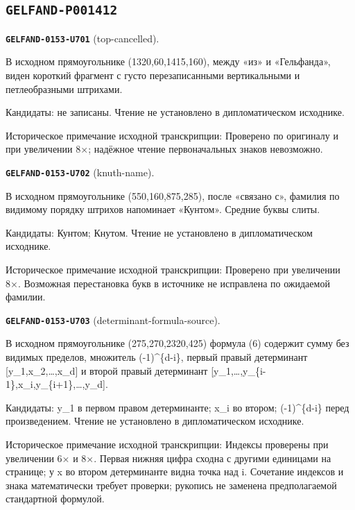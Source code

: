 \subsection*{\texttt{GELFAND-P001412}}
\par\noindent\leavevmode{}\label{GELFAND-0153-U701}\textbf{\texttt{GELFAND-0153-U701}} (top-cancelled).\nopagebreak[4]\par
В исходном прямоугольнике (1320,60,1415,160), между «из» и «Гельфанда», виден короткий фрагмент с густо перезаписанными вертикальными и петлеобразными штрихами.\par
Кандидаты: не записаны. Чтение не установлено в дипломатическом исходнике.\par
Историческое примечание исходной транскрипции: Проверено по оригиналу и при увеличении 8×; надёжное чтение первоначальных знаков невозможно.\par\medskip
\par\noindent\leavevmode{}\label{GELFAND-0153-U702}\textbf{\texttt{GELFAND-0153-U702}} (knuth-name).\nopagebreak[4]\par
В исходном прямоугольнике (550,160,875,285), после «связано с», фамилия по видимому порядку штрихов напоминает «Кунтом». Средние буквы слиты.\par
Кандидаты: Кунтом; Кнутом. Чтение не установлено в дипломатическом исходнике.\par
Историческое примечание исходной транскрипции: Проверено при увеличении 8×. Возможная перестановка букв в источнике не исправлена по ожидаемой фамилии.\par\medskip
\par\noindent\leavevmode{}\label{GELFAND-0153-U703}\textbf{\texttt{GELFAND-0153-U703}} (determinant-formula-source).\nopagebreak[4]\par
В исходном прямоугольнике (275,270,2320,425) формула (6) содержит сумму без видимых пределов, множитель (-1)\textasciicircum{}\{d-i\}, первый правый детерминант [y\_1,x\_2,…,x\_d] и второй правый детерминант [y\_1,…,y\_\{i-1\},x\_i,y\_\{i+1\},…,y\_d].\par
Кандидаты: y\_1 в первом правом детерминанте; x\_i во втором; (-1)\textasciicircum{}\{d-i\} перед произведением. Чтение не установлено в дипломатическом исходнике.\par
Историческое примечание исходной транскрипции: Индексы проверены при увеличении 6× и 8×. Первая нижняя цифра сходна с другими единицами на странице; у x во втором детерминанте видна точка над i. Сочетание индексов и знака математически требует проверки; рукопись не заменена предполагаемой стандартной формулой.\par\medskip

